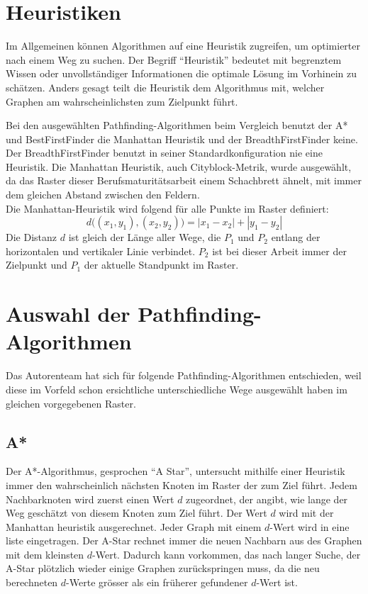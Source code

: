 
\section{Heuristiken}

Im Allgemeinen können Algorithmen auf eine Heuristik zugreifen, um
optimierter nach einem Weg zu suchen. Der Begriff ``Heuristik'' bedeutet
mit begrenztem Wissen oder unvollständiger Informationen die optimale
Lösung im Vorhinein zu schätzen. Anders gesagt teilt die Heuristik dem
Algorithmus mit, welcher Graphen am wahrscheinlichsten zum Zielpunkt führt.

Bei den ausgewählten Pathfinding-Algorithmen beim Vergleich benutzt der A* und
BestFirstFinder die Manhattan Heuristik und der BreadthFirstFinder
keine. Der BreadthFirstFinder benutzt in seiner Standardkonfiguration nie eine
Heuristik. Die Manhattan Heuristik, auch Cityblock-Metrik, wurde
ausgewählt, da das Raster dieser Berufsmaturitätsarbeit einem Schachbrett
ähnelt, mit immer dem gleichen Abstand zwischen den Feldern.\\
Die Manhattan-Heuristik wird folgend für alle Punkte im Raster definiert:
\begin{equation*}
d\big((x_1,y_1),(x_2,y_2)\big) = |x_1 - x_{2}| + |y_{1} - y_{2}|
\end{equation*}
Die Distanz $d$ ist gleich der Länge aller Wege, die $P_1$ und $P_2$ entlang der horizontalen und vertikaler Linie verbindet. $P_2$ ist bei dieser Arbeit immer der Zielpunkt und $P_1$ der
aktuelle Standpunkt im Raster. \cite[Patel, 2019]{heuristicsredblob}

\section{Auswahl der Pathfinding-Algorithmen}

Das Autorenteam hat sich für folgende Pathfinding-Algorithmen
entschieden, weil diese im Vorfeld schon ersichtliche unterschiedliche
Wege ausgewählt haben im gleichen vorgegebenen Raster.

\subsection{A*}

Der A*-Algorithmus, gesprochen ``A Star'', untersucht mithilfe einer
Heuristik immer den wahrscheinlich nächsten Knoten im Raster der zum
Ziel führt. Jedem Nachbarknoten wird zuerst einen Wert $d$ zugeordnet, der
angibt, wie lange der Weg geschätzt von diesem Knoten zum Ziel führt. Der Wert $d$
wird mit der Manhattan heuristik ausgerechnet. Jeder Graph mit einem $d$-Wert 
wird in eine liste eingetragen. Der A-Star rechnet immer die neuen
Nachbarn aus des Graphen mit dem kleinsten $d$-Wert. Dadurch kann
vorkommen, das nach langer Suche, der A-Star plötzlich wieder einige
Graphen zurückspringen muss, da die neu berechneten $d$-Werte grösser als
ein früherer gefundener $d$-Wert ist.
\cite[Schmidt, Fuchs]{asterngeo}

